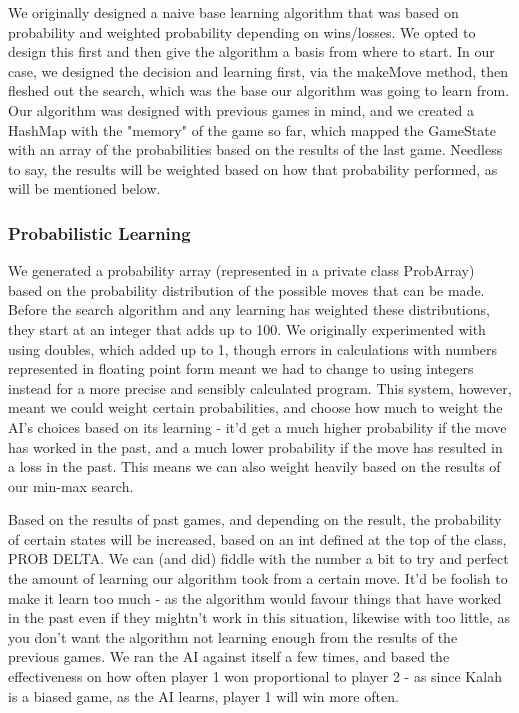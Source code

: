 \documentclass[11pt]{article}
\begin{document}
We originally designed a naive base learning algorithm that was based on probability and weighted probability depending on wins/losses. We opted to design this first and then give the algorithm a basis from where to start. In our case, we designed the decision and learning first, via the makeMove method, then fleshed out the search, which was the base our algorithm was going to learn from. Our algorithm was designed with previous games in mind, and we created a HashMap with the "memory" of the game so far, which mapped the GameState with an array of the probabilities based on the results of the last game. Needless to say, the results will be weighted based on how that probability performed, as will be mentioned below.

\subsubsection{Probabilistic Learning}
\label{sec-3-2-1}

We generated a probability array (represented in a private class ProbArray) based on the probability distribution of the possible moves that can be made. Before the search algorithm and any learning has weighted these distributions, they start at an integer that adds up to 100. We originally experimented with using doubles, which added up to 1, though errors in calculations with numbers represented in floating point form meant we had to change to using integers instead for a more precise and sensibly calculated program. This system, however, meant we could weight certain probabilities, and choose how much to weight the AI's choices based on its learning - it'd get a much higher probability if the move has worked in the past, and a much lower probability if the move has resulted in a loss in the past. This means we can also weight heavily based on the results of our min-max search.

Based on the results of past games, and depending on the result, the probability of certain states will be increased, based on an int defined at the top of the class, PROB DELTA. We can (and did) fiddle with the number a bit to try and perfect the amount of learning our algorithm took from a certain move. It'd be foolish to make it learn too much - as the algorithm would favour things that have worked in the past even if they mightn't work in this situation, likewise with too little, as you don't want the algorithm not learning enough from the results of the previous games. We ran the AI against itself a few times, and based the effectiveness on how often player 1 won proportional to player 2 - as since Kalah is a biased game, as the AI learns, player 1 will win more often.
\end{document}
